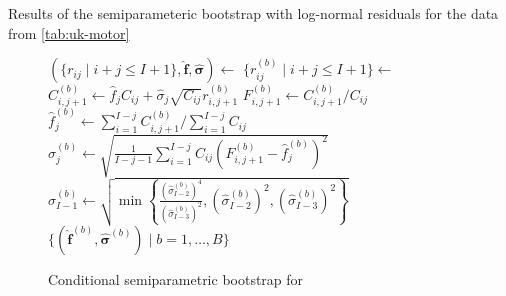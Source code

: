 \documentclass[a4paper]{book}
\begin{document}
\begin{table}[!htb]
  \begin{subtable}{0.5\linewidth}
    
  \end{subtable}
  \hfill
  \begin{subtable}{0.5\linewidth}
    
  \end{subtable}
  \caption{Results of the semiparameteric bootstrap with log-normal residuals for the data from \cref{tab:uk-motor}}
  \label{tab:semiparam-mack-res-log-normal}
\end{table}

\begin{figure}[p]
  \begin{algorithm}[H]
    \caption{Conditional semiparametric bootstrap for }
    \label{alg:cond-semiparam-mack}
    \begin{algorithmic}
      \State $(\{ r_{ij} \mid i + j \leq I + 1 \}, \bm{\widehat{f}}, \bm{\widehat{\sigma}}) \gets$ 
        \State $\{ r^{(b)}_{ij} \mid i + j \leq I + 1 \} \gets$ 
            \State $C^{(b)}_{i, j + 1} \gets \widehat{f}_j C_{ij} + \widehat{\sigma}_j \sqrt{C_{ij}} r^{(b)}_{i, j + 1}$
            \State $F^{(b)}_{i, j + 1} \gets C^{(b)}_{i, j + 1} / C_{ij}$
          \EndFor
          \State $\widehat{f}^{(b)}_j \gets \sum_{i = 1}^{I - j} C^{(b)}_{i, j + 1} / \sum_{i = 1}^{I - j} C_{ij}$
            \State $\widehat{\sigma}^{(b)}_j \gets \sqrt{\frac{1}{I - j - 1}\sum_{i = 1}^{I - j} C_{ij} \left( F^{(b)}_{i, j + 1} - \widehat{f}^{(b)}_j \right)^2}$
          \Else
            \State $\widehat{\sigma}^{(b)}_{I - 1} \gets \sqrt{\min{ \left \{ \frac{(\widehat{\sigma}^{(b)}_{I - 2})^4}{(\widehat{\sigma}^{(b)}_{I - 3})^2}, (\widehat{\sigma}^{(b)}_{I - 2})^2, (\widehat{\sigma}^{(b)}_{I - 3})^2 \right \} }}$
          \EndIf
        \EndFor
      \EndFor
      \State \Return $\{ (\widehat{\bm{f}}^{(b)}, \widehat{\bm{\sigma}}^{(b)}) \mid b = 1, \dots, B \}$
    \end{algorithmic}
  \end{algorithm}
  \begin{algorithm}[H]

\end{algorithm}
\end{figure}
\end{document}
